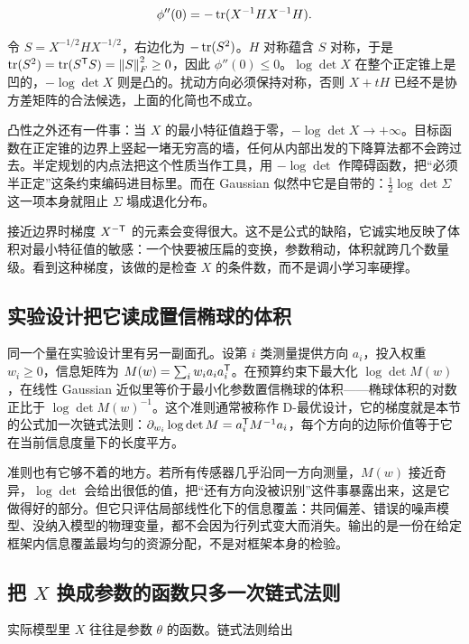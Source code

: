 \[
\phi''(0)=-\operatorname{tr}(X^{-1}HX^{-1}H).
\]

令 \(S=X^{-1/2}HX^{-1/2}\)，右边化为 \(-\operatorname{tr}(S^2)\)。\(H\) 对称蕴含 \(S\) 对称，于是 \(\operatorname{tr}(S^2)=\operatorname{tr}(S^{\mathsf{T}}S)=\left\lVert S\right\rVert_F^2\ge0\)，因此 \(\phi''(0)\le0\)。\(\log\det X\) 在整个正定锥上是凹的，\(-\log\det X\) 则是凸的。扰动方向必须保持对称，否则 \(X+tH\) 已经不是协方差矩阵的合法候选，上面的化简也不成立。

凸性之外还有一件事：当 \(X\) 的最小特征值趋于零，\(-\log\det X\to+\infty\)。目标函数在正定锥的边界上竖起一堵无穷高的墙，任何从内部出发的下降算法都不会跨过去。半定规划的内点法把这个性质当作工具，用 \(-\log\det\) 作障碍函数，把``必须半正定''这条约束编码进目标里。而在 Gaussian 似然中它是自带的：\(\tfrac12\log\det\Sigma\) 这一项本身就阻止 \(\Sigma\) 塌成退化分布。

接近边界时梯度 \(X^{-\mathsf{T}}\) 的元素会变得很大。这不是公式的缺陷，它诚实地反映了体积对最小特征值的敏感：一个快要被压扁的变换，参数稍动，体积就跨几个数量级。看到这种梯度，该做的是检查 \(X\) 的条件数，而不是调小学习率硬撑。

\subsection{实验设计把它读成置信椭球的体积}

同一个量在实验设计里有另一副面孔。设第 \(i\) 类测量提供方向 \(a_i\)，投入权重 \(w_i\ge0\)，信息矩阵为 \(M(w)=\sum_i w_ia_ia_i^{\mathsf{T}}\)。在预算约束下最大化 \(\log\det M(w)\)，在线性 Gaussian 近似里等价于最小化参数置信椭球的体积——椭球体积的对数正比于 \(\log\det M(w)^{-1}\)。这个准则通常被称作 D-最优设计，它的梯度就是本节的公式加一次链式法则：\(\partial_{w_i}\log\det M=a_i^{\mathsf{T}}M^{-1}a_i\)，每个方向的边际价值等于它在当前信息度量下的长度平方。

准则也有它够不着的地方。若所有传感器几乎沿同一方向测量，\(M(w)\) 接近奇异，\(\log\det\) 会给出很低的值，把``还有方向没被识别''这件事暴露出来，这是它做得好的部分。但它只评估局部线性化下的信息覆盖：共同偏差、错误的噪声模型、没纳入模型的物理变量，都不会因为行列式变大而消失。输出的是一份在给定框架内信息覆盖最均匀的资源分配，不是对框架本身的检验。

\subsection{把 \texorpdfstring{\(X\)}{X} 换成参数的函数只多一次链式法则}

实际模型里 \(X\) 往往是参数 \(\theta\) 的函数。链式法则给出


